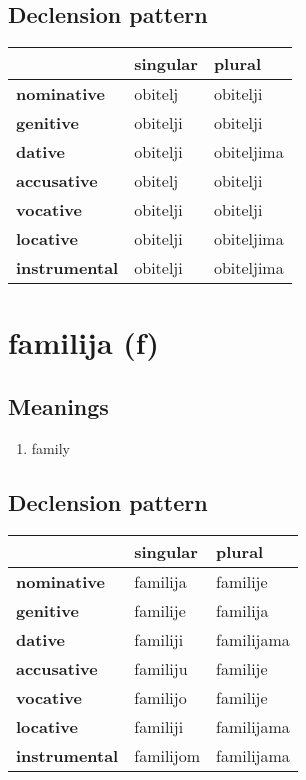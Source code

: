 \subsection*{Declension pattern}
\begin{tabularx}{\linewidth}{Xll}
\toprule
{} &  singular &      plural \\
\midrule
\textbf{nominative  } &   obitelj &    obitelji \\
\textbf{genitive    } &  obitelji &    obitelji \\
\textbf{dative      } &  obitelji &  obiteljima \\
\textbf{accusative  } &   obitelj &    obitelji \\
\textbf{vocative    } &  obitelji &    obitelji \\
\textbf{locative    } &  obitelji &  obiteljima \\
\textbf{instrumental} &  obitelji &  obiteljima \\
\bottomrule
\end{tabularx}

\filbreak
\section{familija (f)}
\subsection*{Meanings}
\begin{enumerate}
\item family
\end{enumerate}
\subsection*{Declension pattern}
\begin{tabularx}{\linewidth}{Xll}
\toprule
{} &   singular &      plural \\
\midrule
\textbf{nominative  } &   familija &    familije \\
\textbf{genitive    } &   familije &    familija \\
\textbf{dative      } &   familiji &  familijama \\
\textbf{accusative  } &   familiju &    familije \\
\textbf{vocative    } &   familijo &    familije \\
\textbf{locative    } &   familiji &  familijama \\
\textbf{instrumental} &  familijom &  familijama \\
\bottomrule
\end{tabularx}

